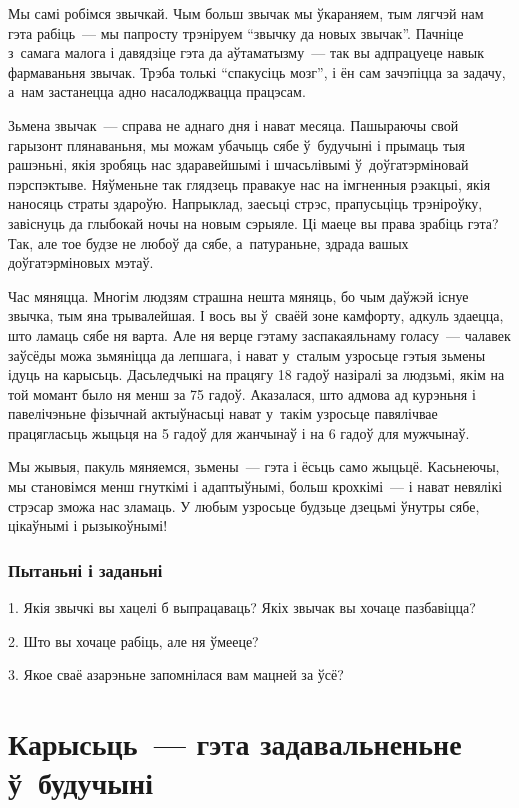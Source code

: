 Мы самі робімся звычкай. Чым больш звычак мы ўкараняем, тым лягчэй нам гэта рабіць~--- мы папросту трэніруем ``звычку да новых звычак''. Пачніце з~самага малога і давядзіце гэта да аўтаматызму~--- так вы адпрацуеце навык фармаваньня звычак. Трэба толькі ``спакусіць мозг'', і ён сам зачэпіцца за задачу, а~нам застанецца адно насалоджвацца працэсам.

Зьмена звычак~--- справа не аднаго дня і нават месяца. Пашыраючы свой гарызонт плянаваньня, мы можам убачыць сябе ў~будучыні і прымаць тыя рашэньні, якія зробяць нас здаравейшымі і шчасьлівымі ў~доўгатэрміновай пэрспэктыве. Няўменьне так глядзець правакуе нас на імгненныя рэакцыі, якія наносяць страты здароўю. Напрыклад, заесьці стрэс, прапусьціць трэніроўку, завіснуць да глыбокай ночы на новым сэрыяле. Ці маеце вы права зрабіць гэта? Так, але тое будзе не любоў да сябе, а~патураньне, здрада вашых доўгатэрміновых мэтаў.

Час мяняцца. Многім людзям страшна нешта мяняць, бо чым даўжэй існуе звычка, тым яна трывалейшая. І вось вы ў~сваёй зоне камфорту, адкуль здаецца, што ламаць сябе ня варта. Але ня верце гэтаму заспакаяльнаму голасу~--- чалавек заўсёды можа зьмяніцца да лепшага, і нават у~сталым узросьце гэтыя зьмены ідуць на карысьць. Дасьледчыкі на працягу 18 гадоў назіралі за людзьмі, якім на той момант было ня менш за 75 гадоў. Аказалася, што адмова ад курэньня і павелічэньне фізычнай актыўнасьці нават у~такім узросьце павялічвае працягласьць жыцьця на 5 гадоў для жанчынаў і на 6 гадоў для мужчынаў.

Мы жывыя, пакуль мяняемся, зьмены~--- гэта і ёсьць само жыцьцё. Касьнеючы, мы становімся менш гнуткімі і адаптыўнымі, больш крохкімі~--- і нават невялікі стрэсар зможа нас зламаць. У любым узросьце будзьце дзецьмі ўнутры сябе, цікаўнымі і рызыкоўнымі!

\subsubsection{Пытаньні і заданьні}

1. Якія звычкі вы хацелі б выпрацаваць? Якіх звычак вы хочаце пазбавіцца?

2. Што вы хочаце рабіць, але ня ўмееце?

3. Якое сваё азарэньне запомнілася вам мацней за ўсё?


\section{Карысьць~--- гэта задавальненьне ў~будучыні}

